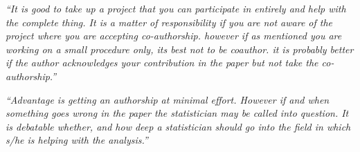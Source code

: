 \documentclass[portrait,11pt]{seminar}
\begin{document}
{\it ``It is good to take up a project that you can participate in entirely and help with the complete thing. It is a matter of responsibility if you are not aware of the project where you are accepting co-authorship. however if as mentioned you are working on a small procedure only, its best not to be coauthor. it is probably better if the author acknowledges your contribution in the paper but not take the co-authorship.''}

\es
\bs

{\it ``Advantage is getting an authorship at minimal effort. However if and when something goes wrong in the paper the statistician may be called into question. It is debatable whether, and how deep a statistician should go into the field in which s/he is helping with the analysis.''}




\es
\bs




\es
\bs


\end{document}
